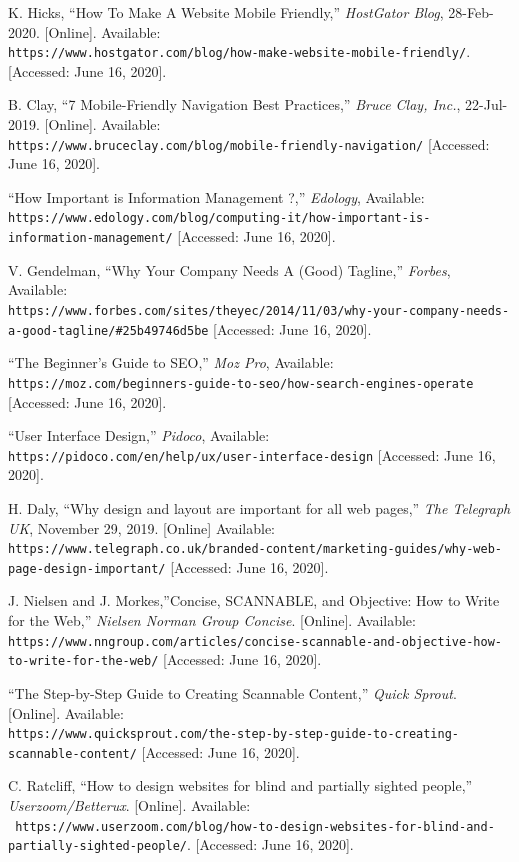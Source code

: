 \documentclass[12pt]{article}
\begin{document}
\begin{thebibliography}{9}
K. Hicks, “How To Make A Website Mobile Friendly,” \textit{HostGator Blog}, 28-Feb-2020.
[Online]. Available:
\\\texttt{https://www.hostgator.com/blog/how-make-website-mobile-friendly/}. [Accessed: June 16, 2020].

B. Clay, “7 Mobile-Friendly Navigation Best Practices,” \textit{Bruce Clay, Inc.},    22-Jul-2019. 
[Online]. Available: \\\texttt{https://www.bruceclay.com/blog/mobile-friendly-navigation/}
[Accessed: June 16, 2020].

 “How Important is Information Management ?,”  \textit{Edology}, Available: \\\texttt{https://www.edology.com/blog/computing-it/how-important-is-information-management/} [Accessed: June 16, 2020].

 V. Gendelman,  “Why Your Company Needs A (Good) Tagline,”  \textit{Forbes}, Available: \\\texttt{https://www.forbes.com/sites/theyec/2014/11/03/why-your-company-needs-a-good-tagline/\#25b49746d5be} [Accessed: June 16, 2020].

“The Beginner’s Guide to SEO,” \textit{Moz Pro}, Available: \\\texttt{https://moz.com/beginners-guide-to-seo/how-search-engines-operate} [Accessed: June 16, 2020].	

 “User Interface Design,” \textit{Pidoco}, Available:\\\texttt{https://pidoco.com/en/help/ux/user-interface-design} [Accessed: June 16, 2020].


H. Daly, “Why design and layout are important for all web pages,” \textit{The Telegraph UK}, November 29, 2019. [Online] Available: \\\texttt{https://www.telegraph.co.uk/branded-content/marketing-guides/why-web-page-design-important/} [Accessed: June 16, 2020].


J. Nielsen and J. Morkes,”Concise, SCANNABLE, and Objective: How to Write for the Web,” \textit{Nielsen Norman Group Concise}. [Online]. Available: \\\texttt{https://www.nngroup.com/articles/concise-scannable-and-objective-how-to-write-for-the-web/} [Accessed: June 16, 2020].

“The Step-by-Step Guide to Creating Scannable Content,” \textit{Quick Sprout}. [Online]. Available: \\\texttt{https://www.quicksprout.com/the-step-by-step-guide-to-creating-scannable-content/} [Accessed: June 16, 2020].

C. Ratcliff, “How to design websites for blind and partially sighted people,” \textit{Userzoom/Betterux}. [Online]. Available: \\\texttt{ https://www.userzoom.com/blog/how-to-design-websites-for-blind-and-partially-sighted-people/}. [Accessed: June 16, 2020].

	
	
\end{thebibliography}
\end{document}

